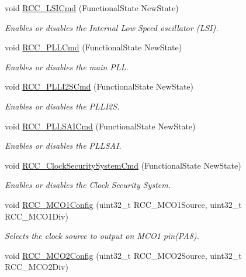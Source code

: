 \begin{DoxyCompactItemize}
void \mbox{\hyperlink{group___r_c_c_ga81e3ca29fd154ac2019bba6936d6d5ed}{R\+C\+C\+\_\+\+L\+S\+I\+Cmd}} (Functional\+State New\+State)
\begin{DoxyCompactList}\small\item\em Enables or disables the Internal Low Speed oscillator (L\+SI). \end{DoxyCompactList}\item 
void \mbox{\hyperlink{group___r_c_c_ga84dee53c75e58fdb53571716593c2272}{R\+C\+C\+\_\+\+P\+L\+L\+Cmd}} (Functional\+State New\+State)
\begin{DoxyCompactList}\small\item\em Enables or disables the main P\+LL. \end{DoxyCompactList}\item 
void \mbox{\hyperlink{group___r_c_c_ga2efe493a6337d5e0034bfcdfb0f541e4}{R\+C\+C\+\_\+\+P\+L\+L\+I2\+S\+Cmd}} (Functional\+State New\+State)
\begin{DoxyCompactList}\small\item\em Enables or disables the P\+L\+L\+I2S. \end{DoxyCompactList}\item 
void \mbox{\hyperlink{group___r_c_c_gaf7b2c8f7533c8321dce97196d9f77fc1}{R\+C\+C\+\_\+\+P\+L\+L\+S\+A\+I\+Cmd}} (Functional\+State New\+State)
\begin{DoxyCompactList}\small\item\em Enables or disables the P\+L\+L\+S\+AI. \end{DoxyCompactList}\item 
void \mbox{\hyperlink{group___r_c_c_ga0ff1fd7b9a8a49cdda11b7d7261c3494}{R\+C\+C\+\_\+\+Clock\+Security\+System\+Cmd}} (Functional\+State New\+State)
\begin{DoxyCompactList}\small\item\em Enables or disables the Clock Security System. \end{DoxyCompactList}\item 
void \mbox{\hyperlink{group___r_c_c_ga15c9ecb6ef015ed008cb28e5b7a50531}{R\+C\+C\+\_\+\+M\+C\+O1\+Config}} (uint32\+\_\+t R\+C\+C\+\_\+\+M\+C\+O1\+Source, uint32\+\_\+t R\+C\+C\+\_\+\+M\+C\+O1\+Div)
\begin{DoxyCompactList}\small\item\em Selects the clock source to output on M\+C\+O1 pin(\+P\+A8). \end{DoxyCompactList}\item 
void \mbox{\hyperlink{group___r_c_c_gaf50f10675b747de60c739e44e5c22aee}{R\+C\+C\+\_\+\+M\+C\+O2\+Config}} (uint32\+\_\+t R\+C\+C\+\_\+\+M\+C\+O2\+Source, uint32\+\_\+t R\+C\+C\+\_\+\+M\+C\+O2\+Div)

\end{DoxyCompactItemize}
